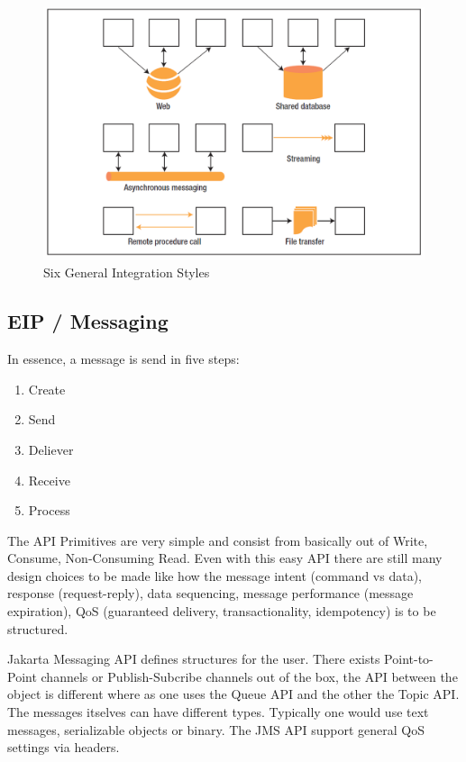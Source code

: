 \documentclass[../Main.tex]{subfiles}
\begin{document}
\begin{figure}[H]
    \centering
    \includegraphics[width=0.75\linewidth]{Images/general-integration-styles.png}
    \caption{Six General Integration Styles}
\end{figure}

\newpage
\subsection{EIP / Messaging}
\begin{multicols}{2}
    In essence, a message is send in five steps:
    \begin{enumerate}
        \item Create
        \item Send
        \item Deliever
        \item Receive
        \item Process
    \end{enumerate}

    The API Primitives are very simple and consist from basically out of Write, Consume, Non-Consuming Read.
    Even with this easy API there are still many design choices to be made like
    how the message intent (command vs data), response (request-reply), data sequencing, message performance (message expiration),
    QoS (guaranteed delivery, transactionality, idempotency) is to be structured.

    Jakarta Messaging API defines structures for the user. There exists Point-to-Point channels or Publish-Subcribe channels out
    of the box, the API between the object is different where as one uses the Queue API and the other the Topic API.
    The messages itselves can have different types. Typically one would use text messages, serializable objects or binary.
    The JMS API support general QoS settings via headers.
\end{multicols}
\end{document}
